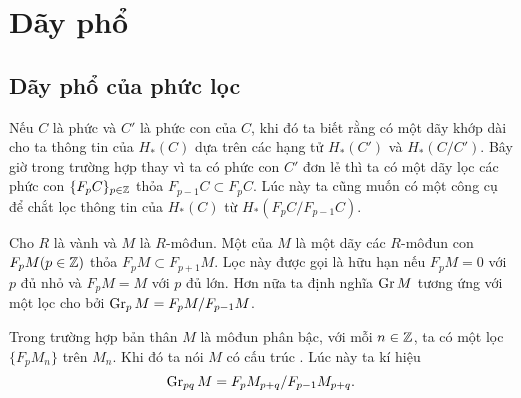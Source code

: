 \section{Dãy phổ}

\subsection{Dãy phổ của phức lọc}
Nếu $C$ là phức và $C'$ là phức con của $C$, khi đó ta biết rằng có một dãy khớp dài cho ta thông tin của $H_*(C)$ dựa trên các hạng tử $H_*(C')$ và $H_*(C/C')$. Bây giờ trong trường hợp thay vì ta có phức con $C'$ đơn lẻ thì ta có một dãy lọc các phức con $\{F_pC\}_{p \in \mathbb Z}$ thỏa $F_{p-1}C \subset F_pC$. Lúc này ta cũng muốn có một công cụ để chắt lọc thông tin của $H_*(C)$ từ $H_*(F_pC / F_{p-1}C)$.

\begin{define}
    Cho $R$ là vành và $M$ là $R$-môđun. Một  của $M$ là một dãy các $R$-môđun con $F_pM (p \in \mathbb Z)$ thỏa $F_pM \subset F_{p+1}M$. Lọc này được gọi là hữu hạn nếu $F_pM = 0$ với $p$ đủ nhỏ và $F_pM = M$ với $p$ đủ lớn. Hơn nữa ta định nghĩa  $\operatorname{Gr} M$ tương ứng với một lọc cho bởi $\operatorname{Gr}_p M = F_pM / F_{p-1}M$.

    Trong trường hợp bản thân $M$ là môđun phân bậc, với mỗi $n \in \mathbb Z$, ta có một lọc $\{F_p M_n\}$ trên $M_n$. Khi đó ta nói $M$ có cấu trúc . Lúc này ta kí hiệu
    $$
        \operatorname{Gr}_{pq} M = F_p M_{p+q} / F_{p-1} M_{p+q}.
    $$


\end{define}
